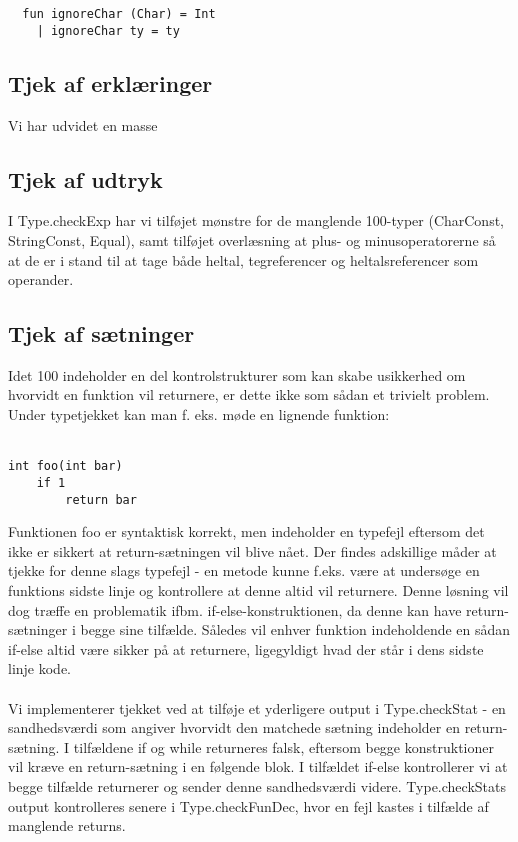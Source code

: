 \documentclass[10pt,a4paper,danish]{article}
\begin{document}
\begin{verbatim}
  fun ignoreChar (Char) = Int
    | ignoreChar ty = ty
\end{verbatim}

\subsection{Tjek af erklæringer}
Vi har udvidet en masse 

 
\subsection{Tjek af udtryk}
I Type.checkExp har vi tilføjet mønstre for de manglende 100-typer (CharConst, 
StringConst, Equal), samt tilføjet overlæsning at plus- og minusoperatorerne
så at de er i stand til at tage både heltal, tegreferencer og heltalsreferencer
som operander.  

\subsection{Tjek af sætninger}
Idet 100 indeholder en del kontrolstrukturer som kan skabe usikkerhed om 
hvorvidt en funktion vil returnere, er dette ikke som sådan et trivielt problem.
Under typetjekket kan man f. eks. møde en lignende funktion:\\\\

\begin{verbatim}
int foo(int bar)
    if 1
        return bar
\end{verbatim}

Funktionen foo er syntaktisk korrekt, men indeholder 
en typefejl eftersom det ikke er sikkert at return-sætningen vil
blive nået. Der findes adskillige måder at tjekke for denne slags typefejl -
en metode kunne f.eks. være at undersøge en funktions sidste linje og 
kontrollere at denne altid vil returnere. Denne løsning vil dog
træffe en problematik ifbm. if-else-konstruktionen, da denne
kan have return-sætninger i begge sine tilfælde. Således  vil enhver
funktion indeholdende en sådan if-else altid være sikker på at returnere, 
ligegyldigt hvad der står i dens sidste linje kode.

\paragraph{}
Vi implementerer tjekket ved at tilføje et yderligere output i Type.checkStat - 
en sandhedsværdi som angiver hvorvidt den matchede sætning indeholder
en return-sætning. I tilfældene if og while returneres falsk,
eftersom begge konstruktioner vil kræve en return-sætning i en følgende
blok. I tilfældet if-else kontrollerer vi at begge tilfælde returnerer og 
sender denne sandhedsværdi videre. Type.checkStats output kontrolleres senere
i Type.checkFunDec, hvor en fejl kastes i tilfælde af manglende returns. 
\end{document}
